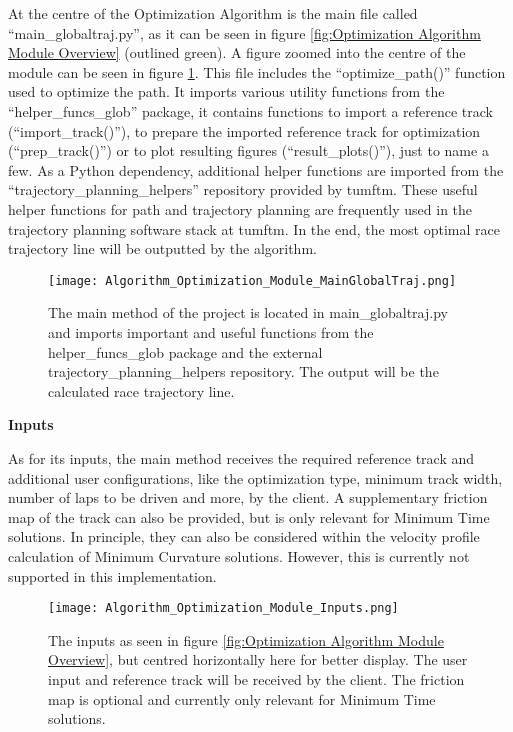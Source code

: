 At the centre of the Optimization Algorithm is the main file called ``main\_globaltraj.py'', as it can be seen in figure \ref{fig:Optimization Algorithm Module Overview} (outlined green). A figure zoomed into the centre of the module can be seen in figure \ref{fig:Optimization Algorithm Module MainGlobalTraj}. This file includes the ``optimize\_path()'' function used to optimize the path. It imports various utility functions from the ``helper\_funcs\_glob'' package, it contains functions to import a reference track (``import\_track()''), to prepare the imported reference track for optimization (``prep\_track()'') or to plot resulting figures (``result\_plots()''), just to name a few. As a Python dependency, additional helper functions are imported from the ``trajectory\_planning\_helpers'' repository provided by \acrshort{tumftm}. \cite{tumftm_trajectory_planning_helpers}
These useful helper functions for path and trajectory planning are frequently used in the trajectory planning software stack at \acrshort{tumftm}.
In the end, the most optimal race trajectory line will be outputted by the algorithm.
\begin{figure}[H]
    \centering
    \texttt{[image: Algorithm\_Optimization\_Module\_MainGlobalTraj.png]}
    \caption{The main method of the project is located in main\_globaltraj.py and imports important and useful functions from the helper\_funcs\_glob package and the external trajectory\_planning\_helpers repository. The output will be the calculated race trajectory line.}
    \label{fig:Optimization Algorithm Module MainGlobalTraj}
\end{figure}

\textbf{Inputs}

As for its inputs, the main method receives the required reference track and additional user configurations, like the optimization type, minimum track width, number of laps to be driven and more, by the client. A supplementary friction map of the track can also be provided, but is only relevant for Minimum Time solutions. In principle, they can also be considered within the velocity profile calculation of Minimum Curvature solutions. However, this is currently not supported in this implementation. \cite{tumftm_optimization_algoritm}
\begin{figure}[H]
    \centering
    \texttt{[image: Algorithm\_Optimization\_Module\_Inputs.png]}
    \caption{The inputs as seen in figure \ref{fig:Optimization Algorithm Module Overview}, but centred horizontally here for better display. The user input and reference track will be received by the client. The friction map is optional and currently only relevant for Minimum Time solutions.}
    \label{fig:Optimization Algorithm Module Inputs}
\end{figure}

